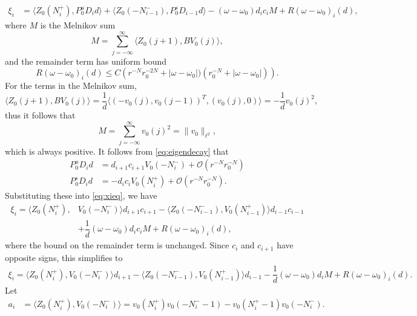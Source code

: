 \documentclass[12pt]{article}
\begin{document}
\begin{equation}\label{eq:xieq}
\begin{aligned}
\xi_i &= \langle Z_0(N_i^+), P_0^u D_i d \rangle 
+ \langle Z_0(-N_{i-1}^-), P_0^s D_{i-1} d \rangle - (\omega - \omega_0) d_i c_i M + R(\omega - \omega_0)_i(d),
\end{aligned}
\end{equation}
where $M$ is the Melnikov sum
\[
M = \sum_{j = -\infty}^{\infty} \langle Z_0(j+1), B V_0(j)\rangle,
\]
and the remainder term has uniform bound
\begin{equation}\label{eq:Rbound}
R(\omega - \omega_0)_i(d) \leq
C \left( r^{-N} r_0^{-2N} + |\omega - \omega_0|)(r_0^{-N} + |\omega - \omega_0| )\right).
\end{equation}
For the terms in the Melnikov sum,
\[
\langle Z_0(j+1), B V_0(j)\rangle = \frac{1}{d} \langle (-v_0(j), v_0(j-1))^T, (v_0(j), 0) \rangle
= -\frac{1}{d}v_0(j)^2,
\]
thus it follows that
\begin{equation}\label{eq:M}
M = \sum_{j = -\infty}^{\infty} v_0(j)^2 = \| v_0 \|_{\ell^2},
\end{equation}
which is always positive. It follows from 
\cref{eq:eigendecay} that
\begin{align*}
P_0^u D_i d &= d_{i+1} c_{i+1} V_0(-N_i^-) + \mathcal{O}\left( r^{-N}r_0^{-N}\right) \\
P_0^s D_i d &= -d_i c_i V_0(N_i^+) + \mathcal{O}\left( r^{-N}r_0^{-N}\right).
\end{align*}
Substituting these into \cref{eq:xieq}, we have
\begin{equation*}
\begin{aligned}
\xi_i = \langle Z_0(N_i^+), &V_0(-N_i^-) \rangle d_{i+1} c_{i+1}
- \langle Z_0(-N_{i-1}^-), V_0(N_{i-1}^+) \rangle d_{i-1} c_{i-1} \\
&+ \dfrac{1}{d} (\omega - \omega_0) d_i c_i M+ R(\omega - \omega_0)_i(d),
\end{aligned}
\end{equation*}
where the bound on the remainder term is unchanged. Since $c_i$ and $c_{i+1}$ have opposite signs, this simplifies to 
\begin{align*}
\xi_i = \langle Z_0(N_i^+), V_0(-N_i^-) \rangle d_{i+1}
- \langle Z_0(-N_{i-1}^-), V_0(N_{i-1}^+) \rangle d_{i-1}
- \dfrac{1}{d} (\omega - \omega_0) d_i M
+ R(\omega - \omega_0)_i(d).
\end{align*}
Let
\begin{align*}
a_i &= \langle Z_0(N_i^+), V_0(-N_i^-) \rangle 
= v_0(N_i^+)v_0(-N_i^- - 1) - v_0(N_i^+ - 1)v_0(-N_i^-).
\end{align*}
\end{document}
